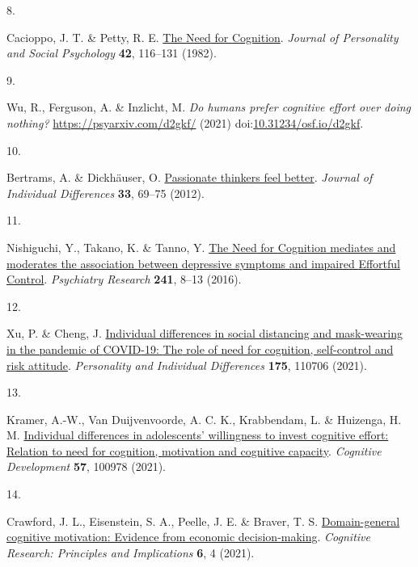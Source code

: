 \documentclass[
  man,floatsintext]{apa6}
\newlength{\cslhangindent}
\newlength{\csllabelwidth}
\newlength{\cslentryspacingunit} %
\newenvironment{CSLReferences}[2] %
 {%
  \setlength{\parindent}{0pt}
  \ifodd #1
  \let\oldpar\par
  \def\par{\hangindent=\cslhangindent\oldpar}
  \fi
  \setlength{\parskip}{#2\cslentryspacingunit}
 }%
 {}
\newcommand{\CSLLeftMargin}[1]{\parbox[t]{\csllabelwidth}{#1}}
\newcommand{\CSLRightInline}[1]{\parbox[t]{\linewidth - \csllabelwidth}{#1}\break}
\begin{document}
\begin{CSLReferences}{0}{0}
\leavevmode{}%
\CSLLeftMargin{8. }%
\CSLRightInline{Cacioppo, J. T. \& Petty, R. E. \href{https://doi.org/10.1037//0022-3514.42.1.116}{The {Need} for {Cognition}}. \emph{Journal of Personality and Social Psychology} \textbf{42}, 116--131 (1982).}

\leavevmode{}%
\CSLLeftMargin{9. }%
\CSLRightInline{Wu, R., Ferguson, A. \& Inzlicht, M. \emph{Do humans prefer cognitive effort over doing nothing?} \url{https://psyarxiv.com/d2gkf/} (2021) doi:\href{https://doi.org/10.31234/osf.io/d2gkf}{10.31234/osf.io/d2gkf}.}

\leavevmode{}%
\CSLLeftMargin{10. }%
\CSLRightInline{Bertrams, A. \& Dickhäuser, O. \href{https://doi.org/10.1027/1614-0001/a000081}{Passionate thinkers feel better}. \emph{Journal of Individual Differences} \textbf{33}, 69--75 (2012).}

\leavevmode{}%
\CSLLeftMargin{11. }%
\CSLRightInline{Nishiguchi, Y., Takano, K. \& Tanno, Y. \href{https://doi.org/10.1016/j.psychres.2016.04.092}{The {Need} for {Cognition} mediates and moderates the association between depressive symptoms and impaired {Effortful} {Control}}. \emph{Psychiatry Research} \textbf{241}, 8--13 (2016).}

\leavevmode{}%
\CSLLeftMargin{12. }%
\CSLRightInline{Xu, P. \& Cheng, J. \href{https://doi.org/10.1016/j.paid.2021.110706}{Individual differences in social distancing and mask-wearing in the pandemic of {COVID}-19: {The} role of need for cognition, self-control and risk attitude}. \emph{Personality and Individual Differences} \textbf{175}, 110706 (2021).}

\leavevmode{}%
\CSLLeftMargin{13. }%
\CSLRightInline{Kramer, A.-W., Van Duijvenvoorde, A. C. K., Krabbendam, L. \& Huizenga, H. M. \href{https://doi.org/10.1016/j.cogdev.2020.100978}{Individual differences in adolescents' willingness to invest cognitive effort: {Relation} to need for cognition, motivation and cognitive capacity}. \emph{Cognitive Development} \textbf{57}, 100978 (2021).}

\leavevmode{}%
\CSLLeftMargin{14. }%
\CSLRightInline{Crawford, J. L., Eisenstein, S. A., Peelle, J. E. \& Braver, T. S. \href{https://doi.org/10.1186/s41235-021-00272-7}{Domain-general cognitive motivation: Evidence from economic decision-making}. \emph{Cognitive Research: Principles and Implications} \textbf{6}, 4 (2021).}


\end{CSLReferences}
\end{document}
